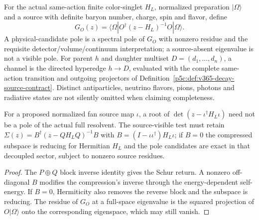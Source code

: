 \documentclass[12pt,a4paper]{article}
\begin{document}
\begin{definition}
\label{p11:def:v365-hadron-pole-channel}
For the actual same-action finite color-singlet $H_L$, normalized
preparation $|\Omega\rangle$ and a source with definite baryon
number, charge, spin and flavor, define
\[
G_O(z)=\langle\Omega|O^\dagger(z-H_L)^{-1}O|\Omega\rangle.
\]
A physical-candidate pole is a spectral pole of $G_O$ with nonzero
residue and the requisite detector/volume/continuum interpretation;
a source-absent eigenvalue is not a visible pole.  For parent
$h$ and daughter multiset $D=(d_1,\ldots,d_n)$, a channel is the
directed hyperedge $h\to D$, evaluated with the complete
same-action transition and outgoing projectors of
Definition~\ref{p5c:def:v365-decay-source-contract}.  Distinct
antiparticles, neutrino flavors, pions, photons and radiative
states are not silently omitted when claiming completeness.
\end{definition}

\begin{proposition}
\label{p11:prop:v365-pole-leakage-test}
For a proposed normalized fan source map $\iota$, a root of
$\det(z-\iota^\dagger H_L\iota)$ need not be a pole of the
actual full resolvent.  The source-visible test must retain
$\Sigma(z)=B^\dagger(z-QH_LQ)^{-1}B$ with
$B=(I-\iota\iota^\dagger)H_L\iota$; if $B=0$ the compressed
subspace is reducing for Hermitian $H_L$ and the pole candidates
are exact in that decoupled sector, subject to nonzero source residues.
\end{proposition}
\begin{proof}
The $P\oplus Q$ block inverse identity gives the Schur return.
A nonzero off-diagonal $B$ modifies the compression's inverse
through the energy-dependent self-energy.  If $B=0$, Hermiticity
also removes the reverse block and the subspace is reducing.
The residue of $G_O$ at a full-space eigenvalue is the squared
projection of $O|\Omega\rangle$ onto the corresponding eigenspace,
which may still vanish.
\end{proof}
\end{document}
